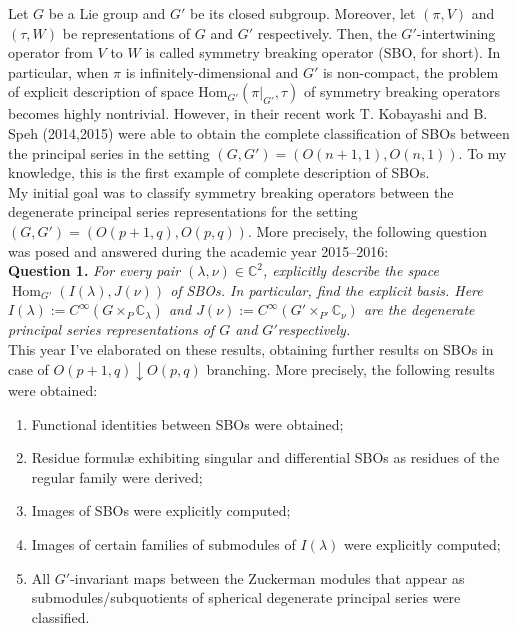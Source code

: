 \documentclass[a4j,twocolumn]{jarticle}
\begin{document}
\vspace{0.5cm}
Let $G$ be a Lie group and $G'$ be its closed subgroup. Moreover, let $(\pi,V)$ and $(\tau,W)$ be representations of $G$ and $G'$
respectively. Then, the $G'$-intertwining operator from $V$ to $W$ is called symmetry breaking operator (SBO, for short). In particular, when 
$\pi$ is infinitely-dimensional and $G'$ is non-compact, the problem of explicit description of space
$\mbox{Hom}_{G'}(\pi\big|_{G'},\tau)$ of symmetry breaking operators becomes highly nontrivial. However, in their recent work 
T. Kobayashi and B. Speh (2014,2015) were able to obtain the complete classification of SBOs between
the principal series in the setting $(G, G') = (O(n+1,1),O(n,1))$. To my knowledge, this is the first example of complete
description of SBOs.\\
My initial goal was to classify symmetry breaking operators between the degenerate principal series representations for the setting
$(G, G') = (O(p+1,q),O(p,q))$. More precisely, the following question was posed and answered during the academic year 2015--2016:\\
{\noindent}\textbf{Question \textbf{1}. }{\itshape{For every pair $( \lambda, \nu) \in
\mathbb{C}^2$, explicitly describe the space
$\operatorname{Hom}_{G'}(I(\lambda),J(\nu))$ of SBOs. In particular, find the explicit basis.
Here $I(\lambda):=C^{\infty}\left(  G\times_P\mathbb{C}_\lambda\right)$
and $J(\nu):=C^{\infty}\left( G'\times_{P'}\mathbb{C}_{\nu} \right)$ are the degenerate principal series representations of $G$ and
$G'$respectively.}}\\
This year I've elaborated on these results, obtaining further results on SBOs in case of $O(p+1,q)\downarrow O(p,q)$ branching. More precisely, the following results were obtained:
\begin{enumerate}
	\item Functional identities between SBOs were obtained;
	\item Residue formul\ae\; exhibiting singular and differential SBOs as residues of the regular family were derived;
	\item Images of SBOs were explicitly computed;
	\item Images of certain families of submodules of $I(\lambda)$ were explicitly computed;
	\item
		All $G'$-invariant maps between the Zuckerman modules that appear as submodules/subquotients
		of spherical degenerate principal series were classified.
\end{enumerate}
\end{document}
